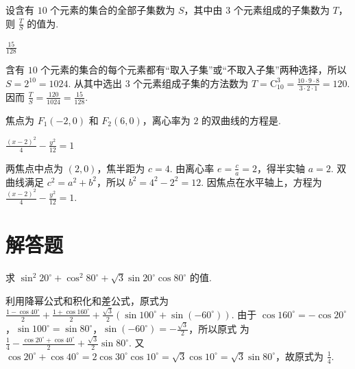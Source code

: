 \documentclass[UTF8,a4paper,oneside,11pt]{ctexbook}
\begin{document}
\begin{problem}
设含有 \(10\) 个元素的集合的全部子集数为 \(S\)，其中由 \(3\) 个元素组成的子集数为 \(T\)，则 \(\frac{T}{S}\) 的值为\fillinblank{}.

\begin{answer}
\(\frac{15}{128}\)
\end{answer}

\begin{solution}
含有 \(10\) 个元素的集合的每个元素都有“取入子集”或“不取入子集”两种选择，所以 \(S=2^{10}=1024\). 从其中选出 \(3\) 个元素组成子集的方法数为 \(T=\mathrm C_{10}^{3}=\frac{10\cdot9\cdot8}{3\cdot2\cdot1}=120\). 因而 \(\frac{T}{S}=\frac{120}{1024}=\frac{15}{128}\).
\end{solution}
\end{problem}

\begin{problem}
焦点为 \(F_{1}(-2,0)\) 和 \(F_{2}(6,0)\)，离心率为 \(2\) 的双曲线的方程是\fillinblank{}.

\begin{answer}
\(\frac{\left(x-2\right)^2}{4}-\frac{y^2}{12}=1\)
\end{answer}

\begin{solution}
两焦点中点为 \((2,0)\)，焦半距为 \(c=4\). 由离心率 \(e=\frac{c}{a}=2\)，得半实轴 \(a=2\). 双曲线满足 \(c^2=a^2+b^2\)，所以 \(b^2=4^2-2^2=12\). 因焦点在水平轴上，方程为 \(\frac{(x-2)^2}{4}-\frac{y^2}{12}=1\).
\end{solution}
\end{problem}

\section{解答题}

\begin{problem}
求 \(\sin^2 20^\circ + \cos^2 80^\circ + \sqrt{3} \sin 20^\circ \cos 80^\circ\) 的值.

\begin{solution}
利用降幂公式和积化和差公式，原式为 \(\frac{1-\cos40^\circ}{2}+\frac{1+\cos160^\circ}{2}+\frac{\sqrt3}{2}\left(\sin100^\circ+\sin(-60^\circ)\right)\).
由于 \(\cos160^\circ=-\cos20^\circ\)，\(\sin100^\circ=\sin80^\circ\)，\(\sin(-60^\circ)=-\frac{\sqrt3}{2}\)，所以原式
为 \(\frac{1}{4}-\frac{\cos20^\circ+\cos40^\circ}{2}+\frac{\sqrt3}{2}\sin80^\circ\).
又 \(\cos20^\circ+\cos40^\circ=2\cos30^\circ\cos10^\circ=\sqrt3\cos10^\circ=\sqrt3\sin80^\circ\)，故原式为 \(\frac{1}{4}\).
\end{solution}
\end{problem}
\end{document}
